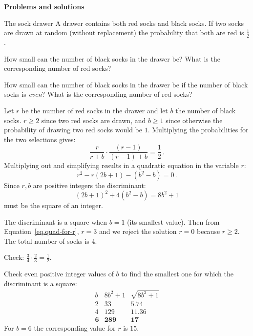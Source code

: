 

\begin{center}
\textbf{\LARGE Problems and solutions}
\end{center}


\begin{prob}{The sock drawer}
A drawer contains both red socks and black socks. If two socks are drawn at random (without replacement) the probability that both are red is $\frac{1}{2}$. 

 How small can the number of black socks in the drawer be? What is the corresponding number of red socks?

 How small can the number of black socks in the drawer be if the number of black socks is \emph{even}? What is the corresponding number of red socks?
\end{prob}


 Let $r$ be the number of red socks in the drawer and let $b$ the number of black socks.  $r\geq 2$ since two red socks are drawn, and $b\geq 1$ since otherwise the probability of drawing two red socks would be $1$. Multiplying the probabilities for the two selections gives:
\begin{equation}\label{eq.1-a}
\frac{r}{r+b} \cdot \frac{(r-1)}{(r-1)+b} = \frac{1}{2}\,.
\end{equation}
Multiplying out and simplifying results in a quadratic equation in the variable $r$:
\begin{equation}\label{eq.quad-for-r}
r^2-r(2b+1)-(b^2-b)=0\,.
\end{equation}
Since $r,b$ are positive integers the discriminant:
\[
(2b+1)^2+4(b^2-b)=8b^2+1
\]
must be the square of an integer.

The discriminant is a square when $b=1$ (its smallest value). Then from Equation~\ref{eq.quad-for-r}, $r=3$ and we reject the solution $r=0$ because $r\geq 2$. The total number of socks is $4$.

Check: $\frac{3}{4}\cdot\frac{2}{3}=\frac{1}{2}$.

\medskip

Check even positive integer values of $b$ to find the smallest one for which the discriminant is a square:
\begin{displaymath}
\renewcommand{\arraystretch}{1}
\begin{array}{r|r|r}
b&8b^2+1&\sqrt{8b^2+1}\\
\hline
2&33&5.74\\
4&129&11.36\\
\mathbf{6}&\mathbf{289}&\mathbf{17}
\end{array}
\end{displaymath}
For $b=6$ the corresponding value for $r$ is $15$.

